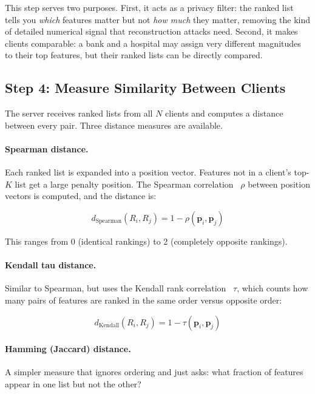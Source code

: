 \documentclass[12pt,a4paper]{article}
\begin{document}
This step serves two purposes. First, it acts as a privacy filter: the ranked list tells you \textit{which} features matter but not \textit{how much} they matter, removing the kind of detailed numerical signal that reconstruction attacks need. Second, it makes clients comparable: a bank and a hospital may assign very different magnitudes to their top features, but their ranked lists can be directly compared.

\subsection{Step 4: Measure Similarity Between Clients}

The server receives ranked lists from all $N$ clients and computes a distance between every pair. Three distance measures are available.

\paragraph{Spearman distance.} Each ranked list is expanded into a position vector. Features not in a client's top-$K$ list get a large penalty position. The Spearman correlation~\cite{spearman1904proof} $\rho$ between position vectors is computed, and the distance is:

\begin{equation}\label{eq:spearman}
  d_{\text{Spearman}}(R_i, R_j) = 1 - \rho(\mathbf{p}_i, \mathbf{p}_j)
\end{equation}

This ranges from 0 (identical rankings) to 2 (completely opposite rankings).

\paragraph{Kendall tau distance.} Similar to Spearman, but uses the Kendall rank correlation~\cite{kendall1938measure} $\tau$, which counts how many pairs of features are ranked in the same order versus opposite order:

\begin{equation}\label{eq:kendall}
  d_{\text{Kendall}}(R_i, R_j) = 1 - \tau(\mathbf{p}_i, \mathbf{p}_j)
\end{equation}

\paragraph{Hamming (Jaccard) distance.} A simpler measure that ignores ordering and just asks: what fraction of features appear in one list but not the other?
\end{document}
